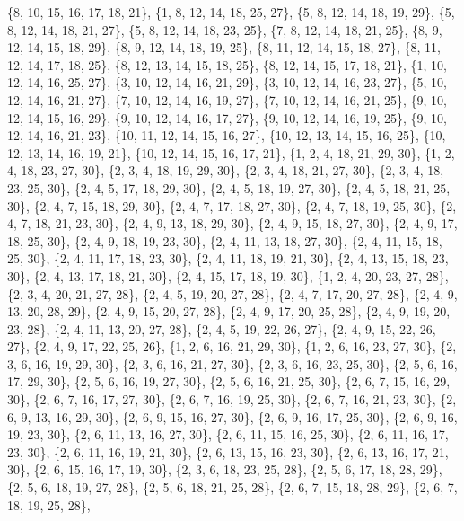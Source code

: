 \documentclass[11pt,a4paper]{article}
\begin{document}
{\{8, 10, 15, 16, 17, 18, 21\}, \{1, 8, 12, 14, 18, 25, 27\}, \{5, 8, 12, 14, 18, 19, 29\}, \{5, 8, 12, 14, 18, 21, 27\}, \{5, 8, 12, 14, 18, 23, 25\},
\{7, 8, 12, 14, 18, 21, 25\}, \{8, 9, 12, 14, 15, 18, 29\}, \{8, 9, 12, 14, 18, 19, 25\}, \{8, 11, 12, 14, 15, 18, 27\}, \{8, 11, 12, 14, 17, 18, 25\},
\{8, 12, 13, 14, 15, 18, 25\}, \{8, 12, 14, 15, 17, 18, 21\}, \{1, 10, 12, 14, 16, 25, 27\}, \{3, 10, 12, 14, 16, 21, 29\}, \{3, 10, 12, 14, 16, 23, 27\},
\{5, 10, 12, 14, 16, 21, 27\}, \{7, 10, 12, 14, 16, 19, 27\}, \{7, 10, 12, 14, 16, 21, 25\}, \{9, 10, 12, 14, 15, 16, 29\}, \{9, 10, 12, 14, 16, 17, 27\},
\{9, 10, 12, 14, 16, 19, 25\}, \{9, 10, 12, 14, 16, 21, 23\}, \{10, 11, 12, 14, 15, 16, 27\}, \{10, 12, 13, 14, 15, 16, 25\}, \{10, 12, 13, 14, 16, 19, 21\},
\{10, 12, 14, 15, 16, 17, 21\}, \{1, 2, 4, 18, 21, 29, 30\}, \{1, 2, 4, 18, 23, 27, 30\}, \{2, 3, 4, 18, 19, 29, 30\}, \{2, 3, 4, 18, 21, 27, 30\},
\{2, 3, 4, 18, 23, 25, 30\}, \{2, 4, 5, 17, 18, 29, 30\}, \{2, 4, 5, 18, 19, 27, 30\}, \{2, 4, 5, 18, 21, 25, 30\}, \{2, 4, 7, 15, 18, 29, 30\},
\{2, 4, 7, 17, 18, 27, 30\}, \{2, 4, 7, 18, 19, 25, 30\}, \{2, 4, 7, 18, 21, 23, 30\}, \{2, 4, 9, 13, 18, 29, 30\}, \{2, 4, 9, 15, 18, 27, 30\},
\{2, 4, 9, 17, 18, 25, 30\}, \{2, 4, 9, 18, 19, 23, 30\}, \{2, 4, 11, 13, 18, 27, 30\}, \{2, 4, 11, 15, 18, 25, 30\}, \{2, 4, 11, 17, 18, 23, 30\},
\{2, 4, 11, 18, 19, 21, 30\}, \{2, 4, 13, 15, 18, 23, 30\}, \{2, 4, 13, 17, 18, 21, 30\}, \{2, 4, 15, 17, 18, 19, 30\}, \{1, 2, 4, 20, 23, 27, 28\},
\{2, 3, 4, 20, 21, 27, 28\}, \{2, 4, 5, 19, 20, 27, 28\}, \{2, 4, 7, 17, 20, 27, 28\}, \{2, 4, 9, 13, 20, 28, 29\}, \{2, 4, 9, 15, 20, 27, 28\},
\{2, 4, 9, 17, 20, 25, 28\}, \{2, 4, 9, 19, 20, 23, 28\}, \{2, 4, 11, 13, 20, 27, 28\}, \{2, 4, 5, 19, 22, 26, 27\}, \{2, 4, 9, 15, 22, 26, 27\},
\{2, 4, 9, 17, 22, 25, 26\}, \{1, 2, 6, 16, 21, 29, 30\}, \{1, 2, 6, 16, 23, 27, 30\}, \{2, 3, 6, 16, 19, 29, 30\}, \{2, 3, 6, 16, 21, 27, 30\},
\{2, 3, 6, 16, 23, 25, 30\}, \{2, 5, 6, 16, 17, 29, 30\}, \{2, 5, 6, 16, 19, 27, 30\}, \{2, 5, 6, 16, 21, 25, 30\}, \{2, 6, 7, 15, 16, 29, 30\},
\{2, 6, 7, 16, 17, 27, 30\}, \{2, 6, 7, 16, 19, 25, 30\}, \{2, 6, 7, 16, 21, 23, 30\}, \{2, 6, 9, 13, 16, 29, 30\}, \{2, 6, 9, 15, 16, 27, 30\},
\{2, 6, 9, 16, 17, 25, 30\}, \{2, 6, 9, 16, 19, 23, 30\}, \{2, 6, 11, 13, 16, 27, 30\}, \{2, 6, 11, 15, 16, 25, 30\}, \{2, 6, 11, 16, 17, 23, 30\},
\{2, 6, 11, 16, 19, 21, 30\}, \{2, 6, 13, 15, 16, 23, 30\}, \{2, 6, 13, 16, 17, 21, 30\}, \{2, 6, 15, 16, 17, 19, 30\}, \{2, 3, 6, 18, 23, 25, 28\},
\{2, 5, 6, 17, 18, 28, 29\}, \{2, 5, 6, 18, 19, 27, 28\}, \{2, 5, 6, 18, 21, 25, 28\}, \{2, 6, 7, 15, 18, 28, 29\}, \{2, 6, 7, 18, 19, 25, 28\},
}
\end{document}
